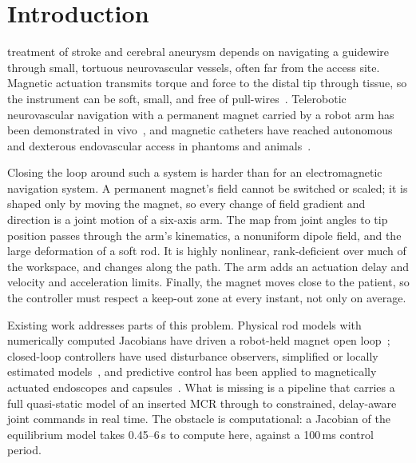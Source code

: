 \documentclass[journal]{IEEEtran}
\begin{document}
\section{Introduction}
\label{sec:intro}

 treatment of stroke and cerebral aneurysm
depends on navigating a guidewire through small, tortuous neurovascular
vessels, often far from the access site. Magnetic actuation transmits
torque and force to the distal tip through tissue, so the instrument can be
soft, small, and free of pull-wires~\cite{kim2019ferromagnetic,
abbott2020magnetic,burgnerkahrs2015continuum,daveiga2020challenges}.
Telerobotic neurovascular navigation with a permanent magnet carried by a
robot arm has been demonstrated in vivo~\cite{kim2022telerobotic}, and
magnetic catheters have reached autonomous and dexterous endovascular
access in phantoms and animals~\cite{pittiglio2022patient,
dreyfus2024dexterous,fu2023magnetic}.

Closing the loop around such a system is harder than for an
electromagnetic navigation system. A permanent magnet's field cannot be
switched or scaled; it is shaped only by moving the magnet, so every
change of field gradient and direction is a joint motion of a six-axis arm.
The map from joint angles to tip position passes through the arm's
kinematics, a nonuniform dipole field, and the large deformation of a soft
rod. It is highly nonlinear, rank-deficient over much of the workspace,
and changes along the path. The arm adds an actuation delay and velocity
and acceleration limits. Finally, the magnet moves close to the patient,
so the controller must respect a keep-out zone at every instant, not only
on average.

Existing work addresses parts of this problem. Physical rod models with
numerically computed Jacobians have driven a robot-held magnet open
loop~\cite{kratchman2017guiding}; closed-loop controllers have used
disturbance observers, simplified or locally estimated
models~\cite{wu2025closedloop,pratt2023observed,pittiglio2023closedloop},
and predictive control has been applied to magnetically actuated
endoscopes and capsules~\cite{xu2025wholebody,isitman2024trajectory}. What
is missing is a pipeline that carries a full quasi-static model of an
inserted MCR through to constrained, delay-aware joint commands in real
time. The obstacle is computational: a Jacobian of the equilibrium model
takes 0.45--6\,s to compute here, against a 100\,ms control period.
\end{document}

